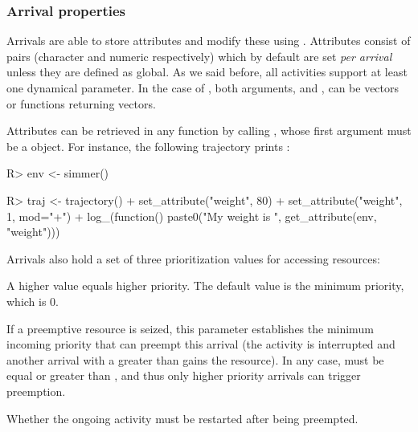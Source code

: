\documentclass[
  nojss]{jss}
\providecommand{\tightlist}{%
  \setlength{\itemsep}{0pt}\setlength{\parskip}{0pt}}
\begin{document}
\subsubsection{Arrival properties}\label{arrival-properties}

Arrivals are able to store attributes and modify these using
. Attributes consist of pairs 
(character and numeric respectively) which by default are set \emph{per
arrival} unless they are defined as global. As we said before, all
activities support at least one dynamical parameter. In the case of
, both arguments,  and ,
can be vectors or functions returning vectors.

Attributes can be retrieved in any  function by calling
, whose first argument must be a 
object. For instance, the following trajectory prints :

\begin{CodeChunk}
\begin{CodeInput}
R> env <- simmer()
\end{CodeInput}
\end{CodeChunk}

\begin{CodeChunk}
\begin{CodeInput}
R> traj <- trajectory() %
+   set_attribute("weight", 80) %
+   set_attribute("weight", 1, mod="+") %
+   log_(function() paste0("My weight is ", get_attribute(env, "weight")))
\end{CodeInput}
\end{CodeChunk}

Arrivals also hold a set of three prioritization values for accessing
resources:

\begin{description}
\tightlist
\item[priority]
A higher value equals higher priority. The default value is the minimum
priority, which is 0.
\item[preemptible]
If a preemptive resource is seized, this parameter establishes the
minimum incoming priority that can preempt this arrival (the activity is
interrupted and another arrival with a  greater than
 gains the resource). In any case, 
must be equal or greater than , and thus only higher
priority arrivals can trigger preemption.
\item[restart]
Whether the ongoing activity must be restarted after being preempted.
\end{description}
\end{document}
